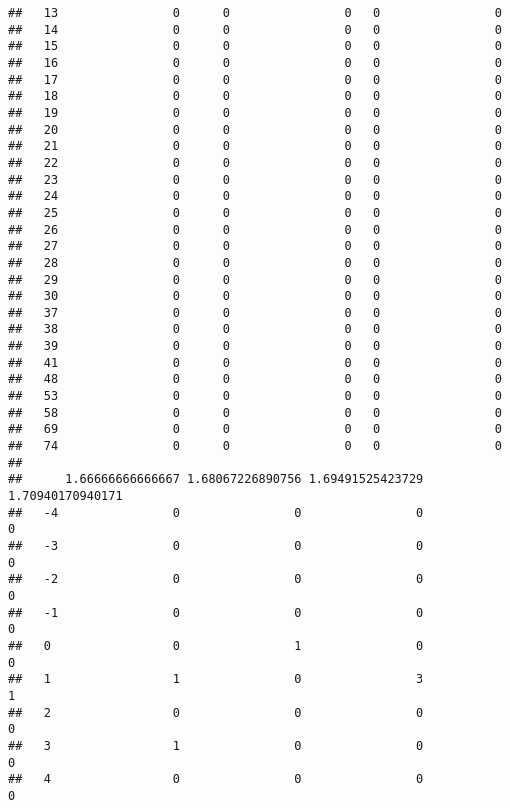 \documentclass[]{article}
\begin{document}
\begin{verbatim}
##   13                0      0                0   0                0
##   14                0      0                0   0                0
##   15                0      0                0   0                0
##   16                0      0                0   0                0
##   17                0      0                0   0                0
##   18                0      0                0   0                0
##   19                0      0                0   0                0
##   20                0      0                0   0                0
##   21                0      0                0   0                0
##   22                0      0                0   0                0
##   23                0      0                0   0                0
##   24                0      0                0   0                0
##   25                0      0                0   0                0
##   26                0      0                0   0                0
##   27                0      0                0   0                0
##   28                0      0                0   0                0
##   29                0      0                0   0                0
##   30                0      0                0   0                0
##   37                0      0                0   0                0
##   38                0      0                0   0                0
##   39                0      0                0   0                0
##   41                0      0                0   0                0
##   48                0      0                0   0                0
##   53                0      0                0   0                0
##   58                0      0                0   0                0
##   69                0      0                0   0                0
##   74                0      0                0   0                0
##     
##      1.66666666666667 1.68067226890756 1.69491525423729 1.70940170940171
##   -4                0                0                0                0
##   -3                0                0                0                0
##   -2                0                0                0                0
##   -1                0                0                0                0
##   0                 0                1                0                0
##   1                 1                0                3                1
##   2                 0                0                0                0
##   3                 1                0                0                0
##   4                 0                0                0                0

\end{verbatim}
\end{document}
